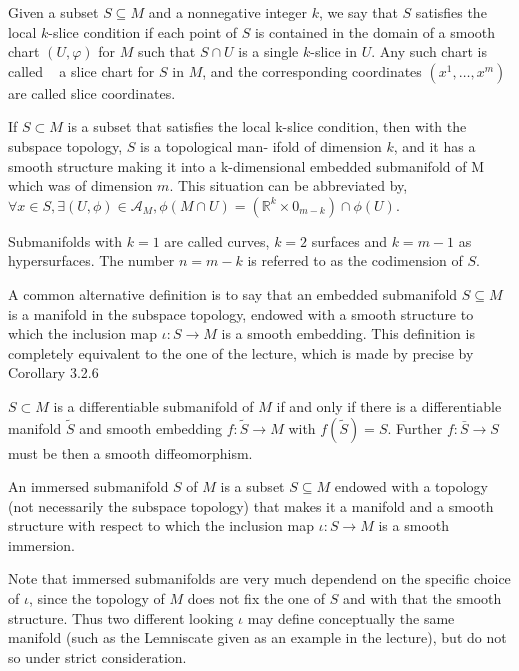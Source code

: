 Given a subset \(S \subseteq M\) and a nonnegative integer \(k\), we say that \(S\) satisfies the local \(k\)-slice condition if each point of \(S\) is contained in the domain of a smooth chart \((U, \varphi)\) for \(M\) such that \(S \cap U\) is a single \(k\)-slice in \(U\). Any such chart is called   
a slice chart for \(S\) in \(M\), and the corresponding coordinates \((x^1, \dots, x^m)\) are called slice coordinates.

If \( S \subset M \) is a subset that satisfies the local k-slice condition, then with the subspace topology, \( S \) is a topological man-
ifold of dimension \( k \), and it has a smooth structure making it into a k-dimensional embedded submanifold of M which was of dimension \( m \).
This situation can be abbreviated by, \( \forall x \in S, \exists (U, \phi) \in \mathcal{A}_M, \phi(M \cap U) = (\mathbb{R}^k \times 0_{m-k}) \cap \phi(U) \).

Submanifolds with \( k=1 \) are called curves, \( k=2 \) surfaces and \( k = m - 1 \) as hypersurfaces. The number \( n = m - k \) is referred to as the codimension of \( S \).

A common alternative definition is to say that an embedded submanifold \( S \subseteq M \) is a manifold in the subspace topology, endowed with a smooth
structure to which the inclusion map \( \iota : S \to M \) is a smooth embedding. 
This definition is completely equivalent to the one of the lecture, which is made by precise by Corollary 3.2.6

\( S \subset M \) is a differentiable submanifold of \( M \) if and only if there is a differentiable manifold \( \tilde{S} \) and smooth embedding
\( f : \tilde{S} \to M \) with \( f(\tilde{S}) = S \). Further \( f : \bar{S} \to S \) must be then a smooth diffeomorphism.

An immersed submanifold \( S \) of \( M \) is a subset \( S \subseteq M \) endowed with a topology (not necessarily the subspace topology)
that makes it a manifold and a smooth structure with respect to which the inclusion map \( \iota : S \to M\) is a smooth immersion.

Note that immersed submanifolds are very much dependend on the specific choice of \( \iota \), since the topology of \( M \) does not fix the one of \( S \)
and with that the smooth structure. Thus two different looking \( \iota \) may define conceptually the same manifold (such as the Lemniscate given as an example in the lecture), but do not so under strict consideration.

